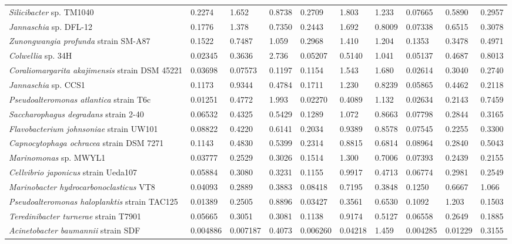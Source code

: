 \begin{sidewaystable}
\begin{tabularx}{\textheight}{Xlllllllll}
\emph{Silicibacter} sp. TM1040 & 0.2274 & 1.652 & 0.8738 & 0.2709 & 1.803 & 1.233 & 0.07665 & 0.5890 & 0.2957\\
\emph{Jannaschia} sp. DFL-12 & 0.1776 & 1.378 & 0.7350 & 0.2443 & 1.692 & 0.8009 & 0.07338 & 0.6515 & 0.3078\\
\emph{Zunongwangia profunda} strain SM-A87 & 0.1522 & 0.7487 & 1.059 & 0.2968 & 1.410 & 1.204 & 0.1353 & 0.3478 & 0.4971\\
\emph{Colwellia} sp. 34H & 0.02345 & 0.3636 & 2.736 & 0.05207 & 0.5140 & 1.041 & 0.05137 & 0.4687 & 0.8013\\
\emph{Coraliomargarita akajimensis} strain DSM 45221 & 0.03698 & 0.07573 & 0.1197 & 0.1154 & 1.543 & 1.680 & 0.02614 & 0.3040 & 0.2740\\
\emph{Jannaschia} sp. CCS1 & 0.1173 & 0.9344 & 0.4784 & 0.1711 & 1.230 & 0.8239 & 0.05865 & 0.4462 & 0.2118\\
\emph{Pseudoalteromonas atlantica} strain T6c & 0.01251 & 0.4772 & 1.993 & 0.02270 & 0.4089 & 1.132 & 0.02634 & 0.2143 & 0.7459\\
\emph{Saccharophagus degradans} strain 2-40 & 0.06532 & 0.4325 & 0.5429 & 0.1289 & 1.072 & 0.8663 & 0.07798 & 0.2844 & 0.3165\\
\emph{Flavobacterium johnsoniae} strain UW101 & 0.08822 & 0.4220 & 0.6141 & 0.2034 & 0.9389 & 0.8578 & 0.07545 & 0.2255 & 0.3300\\
\emph{Capnocytophaga ochracea} strain DSM 7271 & 0.1143 & 0.4830 & 0.5399 & 0.2314 & 0.8815 & 0.6814 & 0.08964 & 0.2840 & 0.5043\\
\emph{Marinomonas} sp. MWYL1 & 0.03777 & 0.2529 & 0.3026 & 0.1514 & 1.300 & 0.7006 & 0.07393 & 0.2439 & 0.2155\\
\emph{Cellvibrio japonicus} strain Ueda107 & 0.05884 & 0.3080 & 0.3231 & 0.1155 & 0.9917 & 0.4713 & 0.06774 & 0.2981 & 0.2549\\
\emph{Marinobacter hydrocarbonoclasticus} VT8 & 0.04093 & 0.2889 & 0.3883 & 0.08418 & 0.7195 & 0.3848 & 0.1250 & 0.6667 & 1.066\\
\emph{Pseudoalteromonas haloplanktis} strain TAC125 & 0.01389 & 0.2505 & 0.8896 & 0.03427 & 0.3561 & 0.6530 & 0.1092 & 1.203 & 0.1503\\
\emph{Teredinibacter turnerae} strain T7901 & 0.05665 & 0.3051 & 0.3081 & 0.1138 & 0.9174 & 0.5127 & 0.06558 & 0.2649 & 0.1885\\
\emph{Acinetobacter baumannii} strain SDF & 0.004886 & 0.007187 & 0.4073 & 0.006260 & 0.04218 & 1.459 & 0.004285 & 0.01229 & 0.3155\\

\bottomrule
\end{tabularx}
\end{sidewaystable}
